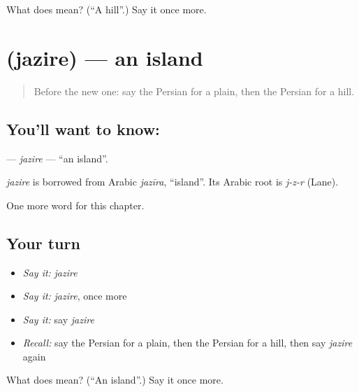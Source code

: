 \begin{tcolorbox}[breakable,colback=teal!4,colframe=teal!35!black,title={Before you move on}]
What does  mean? (\textquotedblleft{}A hill\textquotedblright{}.) Say it once more.
\end{tcolorbox}
\section[\texorpdfstring{\fa{جزیره} (jazire)}{جزیره (jazire)}]{ (jazire) — an island}

\label{lesson:FA-C103-jazire}



\begin{quote}
Before the new one: say the Persian for a plain, then the Persian for a hill.
\end{quote}

\subsection*{You'll want to know: }
\textbf{} — \emph{jazire} — \textquotedblleft{}an island\textquotedblright{}.

\begin{cousinweb}
\emph{jazire} is borrowed from Arabic \emph{jazīra}, \textquotedblleft{}island\textquotedblright{}. Its Arabic root is \emph{j-z-r} (Lane).
\end{cousinweb}

\begin{grammarlens}[title={What you've built}]
One more word for this chapter.
\end{grammarlens}

\subsection*{Your turn}
\begin{itemize}
\raggedright
  \item \emph{Say it:} \emph{jazire}
  \item \emph{Say it:} \emph{jazire}, once more
  \item \emph{Say it:} say \emph{jazire}
  \item \emph{Recall:} say the Persian for a plain, then the Persian for a hill, then say \emph{jazire} again
\end{itemize}

\begin{tcolorbox}[breakable,colback=teal!4,colframe=teal!35!black,title={Before you move on}]
What does  mean? (\textquotedblleft{}An island\textquotedblright{}.) Say it once more.
\end{tcolorbox}
